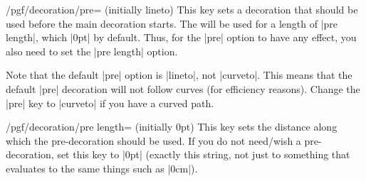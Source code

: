 \begin{key}{/pgf/decoration/pre= (initially lineto)}
  This key sets a decoration that should be used before the main
  decoration starts. The  will be used for a length
  of |pre length|, which |0pt| by default. Thus, for the |pre| option
  to have any effect, you also need to set the |pre length| option.
\begin{codeexample}[]
\end{codeexample}
\begin{codeexample}[]
\end{codeexample}
\begin{codeexample}[]
\end{codeexample}

  Note that the default |pre| option is |lineto|, not |curveto|. This
  means that the default |pre| decoration will not follow curves (for
  efficiency reasons). Change the |pre| key to |curveto| if you have a
  curved path.
\begin{codeexample}[]
\end{codeexample}
\begin{codeexample}[]
\end{codeexample}
\end{key}

\begin{key}{/pgf/decoration/pre length= (initially 0pt)}
  This key sets the distance along which the pre-decoration should be
  used. If you do not need/wish a pre-decoration, set this key to
  |0pt| (exactly this string, not just to something that evaluates to
  the same things such as |0cm|).
\end{key}

